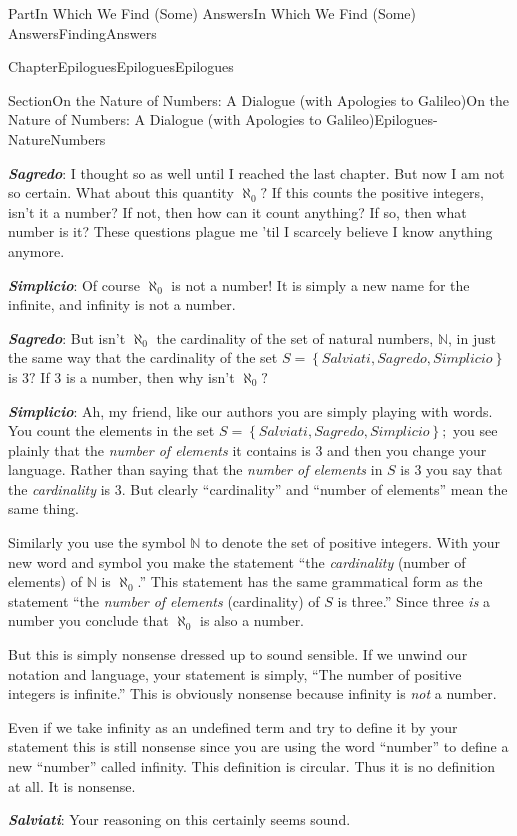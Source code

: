 \documentclass[oneside,10pt,]{book}
\newcommand{\alert}[1]{\textbf{\textit{#1}}}
\numberwithin{equation}{part}
\newcommand{\NN}{\mathbb {N}}
\begin{document}
\begin{partptx}{Part}{In Which We Find (Some) Answers}{}{In Which We Find (Some) Answers}{}{}{FindingAnswers}
\begin{chapterptx}{Chapter}{Epilogues}{}{Epilogues}{}{}{Epilogues}
\begin{sectionptx}{Section}{On the Nature of Numbers: A Dialogue (with Apologies to Galileo)}{}{On the Nature of Numbers: A Dialogue (with Apologies to Galileo)}{}{}{Epilogues-NatureNumbers}
\begin{introduction}{}
\par
\alert{Sagredo}: I thought so as well until I reached the last chapter. But now I am not so certain. What about this quantity \(\aleph_0?\) If this counts the positive integers, isn't it a number? If not, then how can it count anything? If so, then what number is it? These questions plague me 'til I scarcely believe I know anything anymore.%
\par
\alert{Simplicio}: Of course \(\aleph_0\) is not a number! It is simply a new name for the infinite, and infinity is not a number.%
\par
\alert{Sagredo}: But isn't \(\aleph_0\) the cardinality of the set of natural numbers, \(\NN\), in just the same way that the cardinality of the set \(S=\left\{Salviati, Sagredo, Simplicio\right\}\) is \(3?\) If \(3\) is a number, then why isn't \(\aleph_0?\)%
\par
\alert{Simplicio}: Ah, my friend, like our authors you are simply playing with words. You count the elements in the set \(S=\left\{Salviati, Sagredo, Simplicio\right\};\) you see plainly that the \emph{number of elements} it contains is \(3\) and then you change your language. Rather than saying that the \emph{number of elements} in \(S\) is \(3\) you say that the \emph{cardinality} is \(3\). But clearly ``cardinality'' and ``number of elements'' mean the same thing.%
\par
Similarly you use the symbol \(\NN\) to denote the set of positive integers. With your new word and symbol you make the statement ``the \emph{cardinality} (number of elements) of \(\NN\) is \(\aleph_0\).'' This statement has the same grammatical form as the statement ``the \emph{number of elements} (cardinality) of \(S\) is three.'' Since three \emph{is} a number you conclude that \(\aleph_0\) is also a number.%
\par
But this is simply nonsense dressed up to sound sensible. If we unwind our notation and language, your statement is simply, ``The number of positive integers is infinite.'' This is obviously nonsense because infinity is \emph{not} a number.%
\par
Even if we take infinity as an undefined term and try to define it by your statement this is still nonsense since you are using the word ``number'' to define a new ``number'' called infinity. This definition is circular. Thus it is no definition at all. It is nonsense.%
\par
\alert{Salviati}: Your reasoning on this certainly seems sound.%
\par

\end{introduction}
\end{sectionptx}
\end{chapterptx}
\end{partptx}
\end{document}
